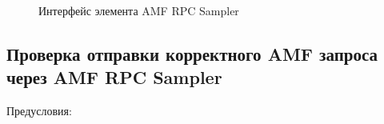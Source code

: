 \begin{enumerate}
\begin{figure}[ht]
\caption{Интерфейс элемента AMF RPC Sampler}
\label{ris:amfSampler.png}
\end{figure}

\end{enumerate}

\subsection{Проверка отправки корректного AMF запроса через AMF RPC Sampler}

Предусловия:

